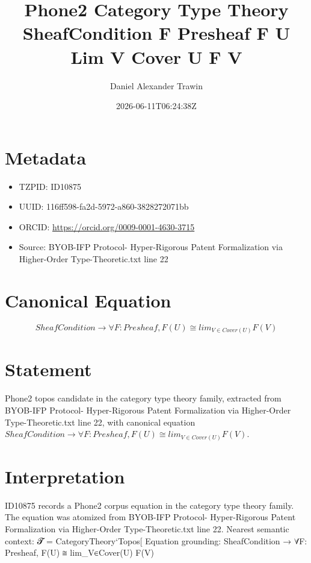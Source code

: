 \documentclass[11pt]{article}
\title{Phone2 Category Type Theory SheafCondition F Presheaf F U Lim V Cover U F V}
\author{Daniel Alexander Trawin}
\date{2026-06-11T06:24:38Z}
\begin{document}
\maketitle
\section*{Metadata}
\begin{itemize}
\item TZPID: ID10875
\item UUID: 116ff598-fa2d-5972-a860-3828272071bb
\item ORCID: \url{https://orcid.org/0009-0001-4630-3715}
\item Source: BYOB-IFP Protocol- Hyper-Rigorous Patent Formalization via Higher-Order Type-Theoretic.txt line 22
\end{itemize}
\section*{Canonical Equation}
\[
SheafCondition → ∀F: Presheaf, F(U) ≅ lim_{V∈Cover(U)} F(V)
\]
\section*{Statement}
Phone2 topos candidate in the category type theory family, extracted from BYOB-IFP Protocol- Hyper-Rigorous Patent Formalization via Higher-Order Type-Theoretic.txt line 22, with canonical equation $SheafCondition → ∀F: Presheaf, F(U) ≅ lim_{V∈Cover(U)} F(V)$.
\section*{Interpretation}
ID10875 records a Phone2 corpus equation in the category type theory family. The equation was atomized from BYOB-IFP Protocol- Hyper-Rigorous Patent Formalization via Higher-Order Type-Theoretic.txt line 22. Nearest semantic context: 𝓣 = CategoryTheory`Topos[ Equation grounding: SheafCondition → ∀F: Presheaf, F(U) ≅ lim_{V∈Cover(U)} F(V)
\end{document}
